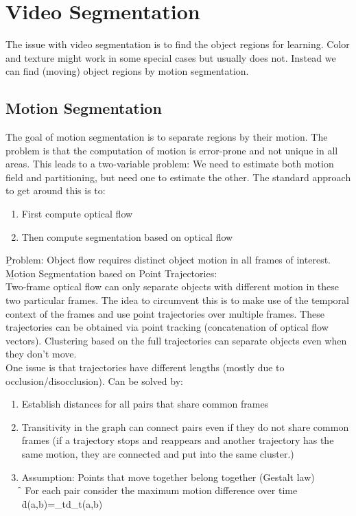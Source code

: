 \section{Video Segmentation}
The issue with video segmentation is to find the object regions for learning. Color and texture might work in some special cases but usually does not. Instead we can find (moving) object regions by motion segmentation. 

\subsection{Motion Segmentation}
The goal of motion segmentation is to separate regions by their motion. The problem is that the computation of motion is error-prone and not unique in all areas. This leads to a two-variable problem: We need to estimate both motion field and partitioning, but need one to estimate the other. The standard approach to get around this is to:
\begin{enumerate}
    \item First compute optical flow
    \item Then compute segmentation based on optical flow
\end{enumerate}
\b{Problem:} Object flow requires distinct object motion in all frames of interest.\\

\b{Motion Segmentation based on Point Trajectories:\\[0.5em]}
Two-frame optical flow can only separate objects with different motion in these two particular frames. The idea to circumvent this is to make use of the temporal context of the frames and use \b{point trajectories over multiple frames}. These trajectories can be obtained via point tracking (concatenation of optical flow vectors). Clustering based on the full trajectories can separate objects even when they don't move.\\

One issue is that trajectories have different lengths (mostly due to occlusion/disocclusion). Can be solved by:
\begin{enumerate}
    \item Establish distances for all pairs that share common frames
    \item Transitivity in the graph can connect pairs even if they do not share common frames (if a trajectory stops and reappears and another trajectory has the same motion, they are connected and put into the same cluster.)
    \item Assumption: Points that move together belong together (Gestalt law)\\
    \f{\to} For each pair consider the maximum motion difference over time \f{d(a,b)=\max_td_t(a,b)}
\end{enumerate}

